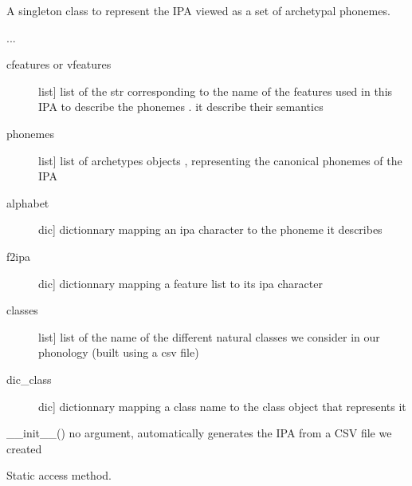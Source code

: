 \documentclass[letterpaper,10pt,english]{sphinxmanual}
\begin{document}
\begin{fulllineitems}
\label{\detokenize{index:IPA.IPA}}
\sphinxAtStartPar
A singleton class to represent the IPA viewed as a set of archetypal phonemes.

\sphinxAtStartPar
...
\begin{description}
\item[{cfeatures or vfeatures}] \leavevmode{[}list{]}
\sphinxAtStartPar
list of the str corresponding to the name of the features used in this IPA to describe the phonemes . it describe their semantics

\item[{phonemes}] \leavevmode{[}list{]}
\sphinxAtStartPar
list of archetypes objects , representing the canonical phonemes of the IPA

\item[{alphabet}] \leavevmode{[}dic{]}
\sphinxAtStartPar
dictionnary mapping an ipa character to the phoneme it describes

\item[{f2ipa}] \leavevmode{[}dic{]}
\sphinxAtStartPar
dictionnary mapping a feature list to its ipa character

\item[{classes}] \leavevmode{[}list{]}
\sphinxAtStartPar
list of the name of the different natural classes we consider in our phonology (built using a csv file)

\item[{dic\_class}] \leavevmode{[}dic{]}
\sphinxAtStartPar
dictionnary mapping a class name to the class object that represents it

\end{description}

\sphinxAtStartPar
\_\_init\_\_() no argument, automatically generates the IPA from a CSV file we created

\begin{fulllineitems}
\label{\detokenize{index:IPA.IPA.get_IPA}}
\sphinxAtStartPar
Static access method.

\end{fulllineitems}



\end{fulllineitems}
\end{document}
